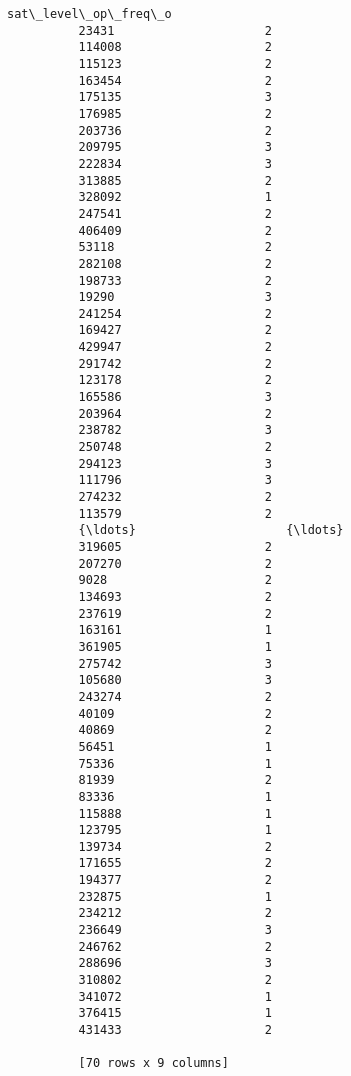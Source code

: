 \documentclass[11pt]{article}
\begin{document}
\begin{Verbatim}[commandchars=\\\{\}]
                  sat\_level\_op\_freq\_o  
          23431                     2  
          114008                    2  
          115123                    2  
          163454                    2  
          175135                    3  
          176985                    2  
          203736                    2  
          209795                    3  
          222834                    3  
          313885                    2  
          328092                    1  
          247541                    2  
          406409                    2  
          53118                     2  
          282108                    2  
          198733                    2  
          19290                     3  
          241254                    2  
          169427                    2  
          429947                    2  
          291742                    2  
          123178                    2  
          165586                    3  
          203964                    2  
          238782                    3  
          250748                    2  
          294123                    3  
          111796                    3  
          274232                    2  
          113579                    2  
          {\ldots}                     {\ldots}  
          319605                    2  
          207270                    2  
          9028                      2  
          134693                    2  
          237619                    2  
          163161                    1  
          361905                    1  
          275742                    3  
          105680                    3  
          243274                    2  
          40109                     2  
          40869                     2  
          56451                     1  
          75336                     1  
          81939                     2  
          83336                     1  
          115888                    1  
          123795                    1  
          139734                    2  
          171655                    2  
          194377                    2  
          232875                    1  
          234212                    2  
          236649                    3  
          246762                    2  
          288696                    3  
          310802                    2  
          341072                    1  
          376415                    1  
          431433                    2  
          
          [70 rows x 9 columns]
\end{Verbatim}
            
\end{document}
